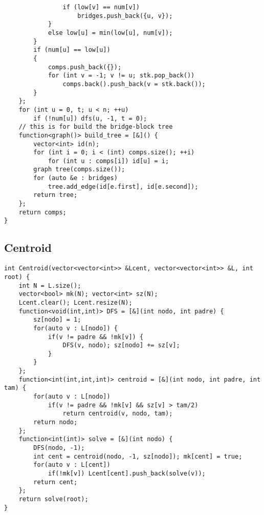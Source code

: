 \documentclass[landscape, 8pt, a4paper, oneside]{extarticle}
\begin{document}
\begin{multicols}{3}
\begin{verbatim}
                if (low[v] == num[v])
                    bridges.push_back({u, v});
            }
            else low[u] = min(low[u], num[v]);
        }
        if (num[u] == low[u])
        {
            comps.push_back({});
            for (int v = -1; v != u; stk.pop_back())
                comps.back().push_back(v = stk.back());
        }
    };
    for (int u = 0, t; u < n; ++u)
        if (!num[u]) dfs(u, -1, t = 0);
    // this is for build the bridge-block tree
    function<graph()> build_tree = [&]() {
        vector<int> id(n);
        for (int i = 0; i < (int) comps.size(); ++i)
            for (int u : comps[i]) id[u] = i;
        graph tree(comps.size());
        for (auto &e : bridges)
            tree.add_edge(id[e.first], id[e.second]);
        return tree;
    };
    return comps;
}
\end{verbatim}
\subsection{Centroid}
\begin{verbatim}
int Centroid(vector<vector<int>> &Lcent, vector<vector<int>> &L, int root) {
    int N = L.size();
    vector<bool> mk(N); vector<int> sz(N);
    Lcent.clear(); Lcent.resize(N);
    function<void(int,int)> DFS = [&](int nodo, int padre) {
        sz[nodo] = 1;
        for(auto v : L[nodo]) {
            if(v != padre && !mk[v]) {
                DFS(v, nodo); sz[nodo] += sz[v];
            }
        }
    };
    function<int(int,int,int)> centroid = [&](int nodo, int padre, int tam) {
        for(auto v : L[nodo])
            if(v != padre && !mk[v] && sz[v] > tam/2)
                return centroid(v, nodo, tam);
        return nodo;
    };
    function<int(int)> solve = [&](int nodo) {
        DFS(nodo, -1);
        int cent = centroid(nodo, -1, sz[nodo]); mk[cent] = true;
        for(auto v : L[cent])
            if(!mk[v]) Lcent[cent].push_back(solve(v));
        return cent;
    };
    return solve(root);
}
\end{verbatim}

\end{multicols}
\end{document}
